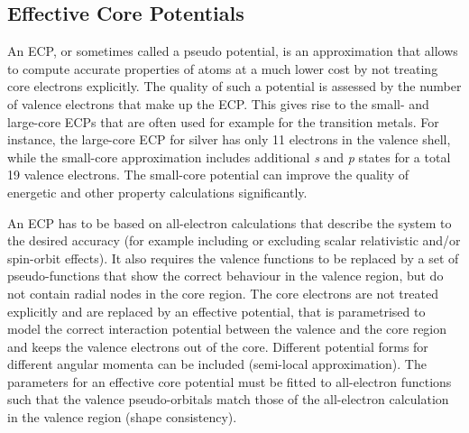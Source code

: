 \subsection{Effective Core Potentials}
\label{sec:ECP}

An \ac{ECP}, or sometimes called a pseudo potential, is an approximation that
allows to compute accurate properties of atoms at a much lower cost by not
treating core electrons explicitly. The quality of such a potential is assessed
by the number of valence electrons that make up the \ac{ECP}. This gives rise to the
small- and large-core \acp{ECP} that are often used for example for the transition metals. For
instance, the large-core \ac{ECP} for silver has only 11 electrons in the
valence shell, while the small-core approximation includes additional
\textit{s} and \textit{p} states for a total 19 valence electrons. The
small-core potential can improve the quality of energetic and other property
calculations significantly.

An \ac{ECP} has to be based on all-electron calculations that describe the
system to the desired accuracy (for example including or excluding scalar
relativistic and/or spin-orbit effects). It also requires the valence functions to be replaced by
a set of pseudo-functions that show the correct behaviour in the valence
region, but do not contain radial nodes in the core region. The core
electrons are not treated explicitly and are replaced by an effective
potential, that is parametrised to model the correct interaction potential
between the valence and the core region and keeps the valence electrons out of the core. 
Different potential forms for
different angular momenta can be included (semi-local approximation). The parameters for an effective
core potential must be fitted to all-electron functions such that the valence
pseudo-orbitals match those of the all-electron calculation in the valence region (shape consistency).

